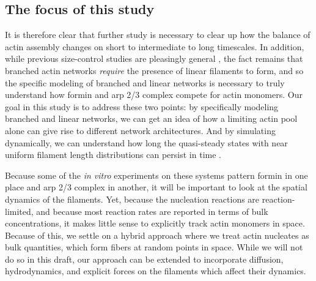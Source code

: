 \documentclass[11pt]{article}
\newcommand{\red}[1]{\color{red}#1\normalcolor}
\begin{document}

\subsection{The focus of this study}
It is therefore clear that further study is necessary to clear up how the balance of actin assembly changes on short to intermediate to long timescales. In addition, while previous size-control studies are pleasingly general \cite{banerjee2022size, mohapatra2017limiting}, the fact remains that branched actin networks \emph{require} the presence of linear filaments to form, and so the specific modeling of branched and linear networks is necessary to truly understand how formin and arp 2/3 complex compete for actin monomers. Our goal in this study is to address these two points: by specifically modeling branched and linear networks, we can get an idea of how a limiting actin pool alone can give rise to different network architectures. And by simulating dynamically, we can understand how long the quasi-steady states with near uniform filament length distributions can persist in time \cite{banerjee2022emergence}. 

Because some of the \emph{in vitro} experiments on these systems pattern formin in one place and arp 2/3 complex in another, it will be important to look at the spatial dynamics of the filaments. Yet, because the nucleation reactions are reaction-limited, and because most reaction rates are reported in terms of bulk concentrations, it makes little sense to explicitly track actin monomers in space. Because of this, we settle on a hybrid approach where we treat actin nucleates as bulk quantities, which form fibers at random points in space. While we will not do so in this draft, our approach can be extended to incorporate diffusion, hydrodynamics, and explicit forces on the filaments which affect their dynamics. %
\end{document}
